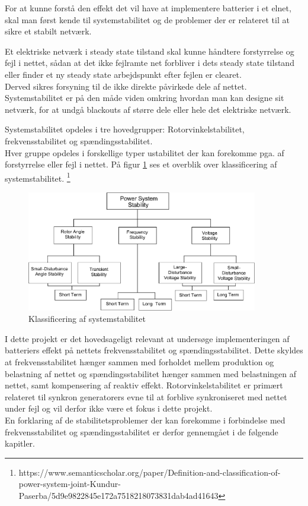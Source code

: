 
\label{Systemstabilitet}
For at kunne forstå den effekt det vil have at implementere batterier i et elnet, skal man først kende til systemstabilitet og de problemer der er relateret til at sikre et stabilt netværk.

Et elektriske netværk i steady state tilstand skal kunne håndtere forstyrrelse og fejl i nettet, sådan at det ikke fejlramte net forbliver i dets steady state tilstand eller finder et ny steady state arbejdspunkt efter fejlen er clearet.\\
Derved sikres forsyning til de ikke direkte påvirkede dele af nettet. Systemstabilitet er på den måde viden omkring hvordan man kan designe sit netværk, for at undgå blackouts af større dele eller hele det elektriske netværk.

Systemstabilitet opdeles i tre hovedgrupper: Rotorvinkelstabilitet, frekvensstabilitet og spændingsstabilitet.\\
Hver gruppe opdeles i forskellige typer ustabilitet der kan forekomme pga. af forstyrrelse eller fejl i nettet. På figur \ref{fig:Overview} ses et overblik over klassificering af systemstabilitet.
\footnote{https://www.semanticscholar.org/paper/Definition-and-classification-of-power-system-joint-Kundur-Paserba/5d9e9822845e172a7518218073831dab4ad41643}

\begin{figure}[H] %
	\centering
	\includegraphics[width=0.9\textwidth]{figurer/Classification_of_power_system_stability}
	\caption{Klassificering af systemstabilitet}
	\label{fig:Overview}
\end{figure}

I dette projekt er det hovedsageligt relevant at undersøge implementeringen af batteriers effekt på nettets frekvensstabilitet og spændingsstabilitet. Dette skyldes at frekvensstabilitet hænger sammen med forholdet mellem produktion og belastning af nettet og spændingsstabilitet hænger sammen med belastningen af nettet, samt kompensering af reaktiv effekt. Rotorvinkelstabilitet er primært relateret til synkron generatorers evne til at forblive synkroniseret med nettet under fejl og vil derfor ikke være et fokus i dette projekt. \\
En forklaring af de stabilitetsproblemer der kan forekomme i forbindelse med frekvensstabilitet og spændingsstabilitet er derfor gennemgået i de følgende kapitler.